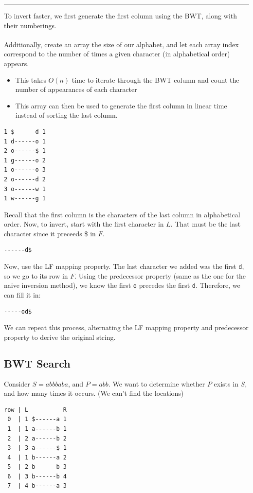 \documentclass[10pt]{article}
\begin{document}
\noindent \rule{\textwidth}{1px}
To invert faster, we first generate the first column using the BWT, along with their numberings.\\\\
Additionally, create an array the size of our alphabet, and let each array index correspond to the number of times a given character (in alphabetical order) appears.
\begin{itemize}
    \item This takes $O(n)$ time to iterate through the BWT column and count the number of appearances of each character
    \item This array can then be used to generate the first column in linear time instead of sorting the last column.
\end{itemize}
\begin{verbatim}
1 $------d 1
1 d------o 1 
2 o------$ 1
1 g------o 2
1 o------o 3
2 o------d 2
3 o------w 1
1 w------g 1
\end{verbatim}
Recall that the first column is the characters of the last column in alphabetical order.  Now, to invert, start with the first character in $L$.  That must be the last character since it preceeds \$ in $F$.
\begin{verbatim}
------d$
\end{verbatim}
Now, use the LF mapping property.  The last character we added was the first \texttt{d}, so we go to its row in $F$.  Using the predecessor property (same as the one for the naive inversion method), we know the first \texttt{o} precedes the first \texttt{d}.  Therefore, we can fill it in:
\begin{verbatim}
-----od$
\end{verbatim}
We can repeat this process, alternating the LF mapping property and predecessor property to derive the original string.

\subsection*{BWT Search}
Consider $S = abbbaba$, and $P = abb$.  We want to determine whether $P$ exists in $S$, and how many times it occurs.  (We can't find the locations)
\begin{verbatim}
row | L          R
 0  | 1 $------a 1
 1  | 1 a------b 1
 2  | 2 a------b 2
 3  | 3 a------$ 1
 4  | 1 b------a 2
 5  | 2 b------b 3
 6  | 3 b------b 4
 7  | 4 b------a 3
\end{verbatim}
\end{document}
